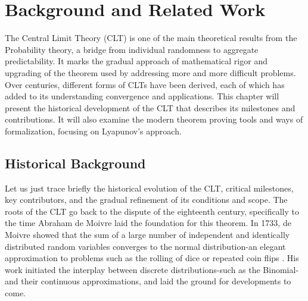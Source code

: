 \chapter[Background and Related Work]{Background and Related Work}
\label{chap:2}

    

The Central Limit Theory (CLT) is one of the main theoretical results from the  Probability theory, a bridge from individual randomness to aggregate predictability. It marks the gradual approach of mathematical rigor and upgrading of the theorem used by addressing more and more difficult problems. Over centuries, different forms of CLTs have been derived, each of which has added to its understanding convergence and applications. This chapter will present the historical development of the CLT that describes its milestones and contributions. It will also examine the modern theorem proving tools and ways of formalization, focusing on Lyapunov's approach.

\section{Historical Background}
Let us just trace briefly the historical evolution of the CLT, critical milestones, key contributors, and the gradual refinement of its conditions and scope. The roots of the CLT go back to the dispute of the eighteenth century, specifically to the time Abraham de Moivre laid the foundation for this theorem. In 1733, de Moivre showed that the sum of a large number of independent and identically distributed random variables converges to the normal distribution-an elegant approximation to problems such as the rolling of dice or repeated coin flips \cite{de1733approximatio}. His work initiated the interplay between discrete distributions-such as the Binomial-and their continuous approximations, and laid the ground for developments to come.

